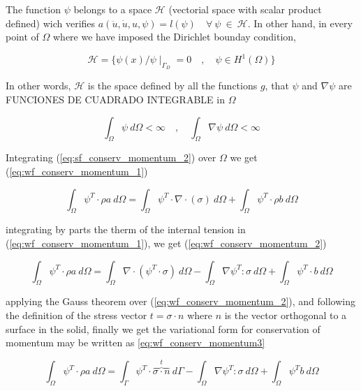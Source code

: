 The function $\psi$ belongs to a space $\mathcal{H}$ (vectorial space
with scalar product defined) wich verifies
$a(\ddot{u},\dot{u},u,\psi)=l(\psi) \quad \forall\ \psi\ \in\
\mathcal{H}$. In other hand, in every point of $\Omega$ where we have
imposed the Dirichlet bounday condition,


\begin{equation}
  \label{eq:hilbert_space}
  \mathcal{H} = \{  \psi(x)/\psi \mid_{\Gamma_D} = 0 \quad , \quad \psi \in H^1(\Omega)  \}
\end{equation}

In other words, $\mathcal{H}$ is the space defined by all the
functions $g$, that $ \psi$ and $\nabla \psi$ are FUNCIONES DE
CUADRADO INTEGRABLE in $\Omega$

\begin{equation}
  \label{eq:def_psi}
  \int_{\Omega}\psi\ d\Omega < \infty \quad , \quad \int_{\Omega}\nabla\psi\ d\Omega < \infty
\end{equation}

Integrating (\ref{eq:sf_conserv_momentum_2}) over $\Omega$ we get
(\ref{eq:wf_conserv_momentum_1})

\begin{equation}
  \label{eq:wf_conserv_momentum_1}
  \int_{\Omega} \psi^T \cdot \rho a\ d\Omega = \int_{\Omega} \psi^T \cdot \nabla\cdot(\sigma)\ d\Omega + \int_{\Omega} \psi^T \cdot \rho b\ d\Omega
\end{equation}

integrating by parts the therm of the internal tension in
(\ref{eq:wf_conserv_momentum_1}), we get (\ref{eq:wf_conserv_momentum_2})

\begin{equation}
  \label{eq:wf_conserv_momentum_2}
  \int_{\Omega} \psi^T\cdot \rho a\ d\Omega = \int_{\Omega}  \nabla\cdot \left( \psi^T \cdot
    \sigma \right)\ d\Omega - \int_{\Omega}  \nabla\psi^T : \sigma\ d\Omega
  + \int_{\Omega} \psi^T\cdot b\ d\Omega
\end{equation}

applying the Gauss theorem over (\ref{eq:wf_conserv_momentum_2}), and following the definition of the stress
vector $t = \sigma \cdot n$ where $n$ is the vector orthogonal to a
surface in the solid, finally we get the variational form for
conservation of momentum may be written as
\ref{eq:wf_conserv_momentum3}

\begin{equation}
  \label{eq:wf_conserv_momentum3}
  \int_{\Omega} \psi^T \cdot \rho a\ d\Omega = \int_{\Gamma}  \psi^T
  \cdot \overbrace{\sigma \cdot n}^{t}\ d\Gamma - \int_{\Omega}  \nabla \psi^T : \sigma\ d\Omega
  + \int_{\Omega} \psi^T b\ d\Omega  
\end{equation}



